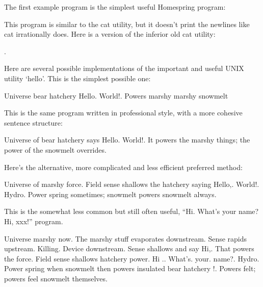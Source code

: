 \documentclass[10pt]{article}
\begin{document}
The first example program is the simplest useful Homespring program:

\begin{verbatim*}

\end{verbatim*}

This program is similar to the cat utility, but it doesn't print the newlines like cat irrationally does. Here is a version of the inferior old cat utility:

\begin{verbatim*}

.
\end{verbatim*}

Here are several possible implementations of the important and useful UNIX utility `hello'. This is the simplest possible one:

\begin{verbatim*}
Universe bear hatchery Hello. World!.
 Powers   marshy marshy snowmelt
\end{verbatim*}

This is the same program written in professional style, with a more cohesive sentence structure:

\begin{verbatim*}
Universe of bear hatchery says Hello. World!.
 It   powers     the marshy things;
the power of the snowmelt overrides.
\end{verbatim*}

Here's the alternative, more complicated and less efficient preferred method:

\begin{verbatim*}
Universe of marshy force. Field sense
shallows the hatchery saying Hello,. World!.
 Hydro. Power spring  sometimes; snowmelt
      powers   snowmelt always.
\end{verbatim*}

This is the somewhat less common but still often useful, ``Hi. What's your name? Hi, xxx!'' program.

\begin{verbatim*}
Universe marshy now. The marshy stuff evaporates downstream. Sense rapids
upstream. Killing. Device downstream. Sense shallows and say Hi,. 
   That powers the     force. Field sense shallows hatchery power.
Hi .. What's. your. name?. 
  Hydro. Power spring  when snowmelt then       powers
    insulated bear hatchery !.
 Powers felt;       powers feel     snowmelt themselves.
\end{verbatim*}
\end{document}
